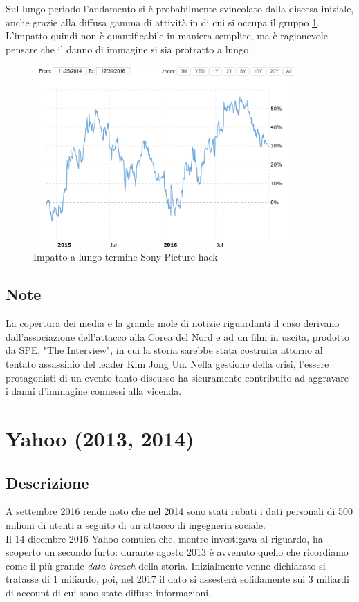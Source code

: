 \documentclass[12pt,a4paper,openright,twoside]{report}
\begin{document}
Sul lungo periodo l'andamento si \`e probabilmente svincolato dalla discesa iniziale, anche  grazie alla diffusa gamma di attivit\`a in di cui si occupa il gruppo \ref{fig:sPic2}. L'impatto quindi non \`e quantificabile in maniera semplice, ma \`e ragionevole pensare che il danno di immagine si sia protratto a lungo.\\
\begin{figure}[H] 
\begin{center} 
\includegraphics[width=10cm]{figures/sony_2014_long.png} 
\caption[Grafico Sony PSN long]{Impatto a lungo termine Sony Picture hack}\label{fig:sPic2}
\end{center}
\end{figure}
\subsection{Note}
La copertura dei media e la grande mole di notizie riguardanti il caso derivano dall'associazione dell'attacco alla Corea del Nord e ad un film in uscita, prodotto da SPE, "The Interview", in cui la storia sarebbe stata costruita attorno al tentato assassinio del leader Kim Jong Un.
Nella gestione della crisi, l'essere protagonisti di un evento tanto discusso ha sicuramente contribuito ad aggravare i danni d'immagine connessi alla vicenda\cite{SonyPic_buzzfeed}.\\

\section{Yahoo (2013, 2014)}
\subsection{Descrizione}
A settembre 2016 rende noto che nel 2014 sono stati rubati i dati personali di 500 milioni di utenti a seguito di un attacco di ingegneria sociale\cite{yahoo_book}.\\
Il 14 dicembre 2016 Yahoo comuica che, mentre investigava al riguardo, ha scoperto un secondo furto: durante agosto 2013 \`e avvenuto quello che ricordiamo come il pi\`u grande \textit{data breach} della storia. Inizialmente venne dichiarato si tratasse di 1 miliardo, poi, nel 2017 il dato si assester\`a solidamente sui 3 miliardi di account di cui sono state diffuse informazioni\cite{yahoo_book}\cite{yahoo_guardian}.
\end{document}
